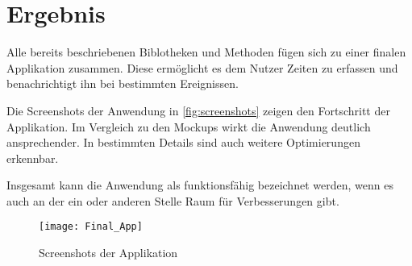 \section{Ergebnis}
Alle bereits beschriebenen Biblotheken und Methoden fügen sich zu einer finalen Applikation zusammen.
Diese ermöglicht es dem Nutzer Zeiten zu erfassen und benachrichtigt ihn bei bestimmten Ereignissen.

Die Screenshots der Anwendung in \autoref{fig:screenshots} zeigen den Fortschritt der Applikation.
Im Vergleich zu den Mockups wirkt die Anwendung deutlich ansprechender.
In bestimmten Details sind auch weitere Optimierungen erkennbar.

Insgesamt kann die Anwendung als funktionsfähig bezeichnet werden,
wenn es auch an der ein oder anderen Stelle Raum für Verbesserungen gibt.

\begin{figure}[h]
    \centering
    \texttt{[image: Final\_App]}
    \caption{Screenshots der Applikation}
    \label{fig:screenshots}
\end{figure}